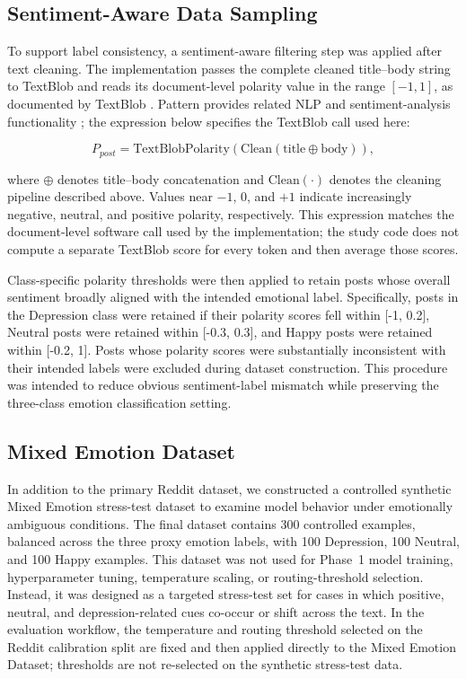 \documentclass{ieeeaccess}
\begin{document}
\subsection{Sentiment-Aware Data Sampling}

To support label consistency, a sentiment-aware filtering step was applied after text cleaning. The implementation passes the complete cleaned title--body string to TextBlob and reads its document-level polarity value in the range $[-1,1]$, as documented by TextBlob \cite{ref41}. Pattern provides related NLP and sentiment-analysis functionality \cite{ref42}; the expression below specifies the TextBlob call used here:

\begin{equation}
P_{post}=\mathrm{TextBlobPolarity}\!\left(\mathrm{Clean}(\mathrm{title}\oplus\mathrm{body})\right),
\label{eq:post-polarity}
\end{equation}

where $\oplus$ denotes title--body concatenation and $\mathrm{Clean}(\cdot)$ denotes the cleaning pipeline described above. Values near $-1$, $0$, and $+1$ indicate increasingly negative, neutral, and positive polarity, respectively. This expression matches the document-level software call used by the implementation; the study code does not compute a separate TextBlob score for every token and then average those scores.

Class-specific polarity thresholds were then applied to retain posts whose overall sentiment broadly aligned with the intended emotional label. Specifically, posts in the Depression class were retained if their polarity scores fell within [-1, 0.2], Neutral posts were retained within [-0.3, 0.3], and Happy posts were retained within [-0.2, 1]. Posts whose polarity scores were substantially inconsistent with their intended labels were excluded during dataset construction. This procedure was intended to reduce obvious sentiment-label mismatch while preserving the three-class emotion classification setting.

\subsection{Mixed Emotion Dataset}

In addition to the primary Reddit dataset, we constructed a controlled synthetic Mixed Emotion stress-test dataset to examine model behavior under emotionally ambiguous conditions. The final dataset contains 300 controlled examples, balanced across the three proxy emotion labels, with 100 Depression, 100 Neutral, and 100 Happy examples. This dataset was not used for Phase~1 model training, hyperparameter tuning, temperature scaling, or routing-threshold selection. Instead, it was designed as a targeted stress-test set for cases in which positive, neutral, and depression-related cues co-occur or shift across the text. In the evaluation workflow, the temperature and routing threshold selected on the Reddit calibration split are fixed and then applied directly to the Mixed Emotion Dataset; thresholds are not re-selected on the synthetic stress-test data.
\end{document}
